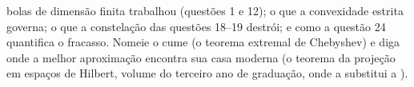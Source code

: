 \begin{problem}
\begin{enumerate}[resume]
        bolas de dimensão finita trabalhou (questões 1 e 12); o que
        a convexidade estrita governa; o que a constelação das
        questões 18--19 destrói; e como a questão 24
        quantifica o fracasso. Nomeie o cume (o teorema
        extremal de Chebyshev) e diga onde a melhor aproximação
        encontra sua casa moderna (o teorema da projeção em espaços de
        Hilbert, volume do terceiro ano de graduação, onde a  substitui
        a ).
\end{enumerate}
\end{problem}

